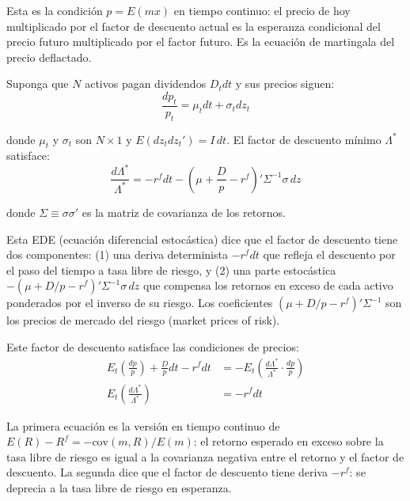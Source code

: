 \documentclass[12pt]{article}
\begin{document}
\begin{intuicionmat}
Esta es la condici\'on $p = E(mx)$ en tiempo continuo: el precio de hoy multiplicado por el factor de descuento actual es la esperanza condicional del precio futuro multiplicado por el factor futuro. Es la ecuaci\'on de martingala del precio deflactado.
\end{intuicionmat}

Suponga que $N$ activos pagan dividendos $D_t dt$ y sus precios siguen:
\begin{equation}
    \frac{dp_t}{p_t} = \mu_t dt + \sigma_t dz_t
\end{equation}

donde $\mu_t$ y $\sigma_t$ son $N \times 1$ y $E(dz_t dz_t') = I\, dt$. El factor de descuento m\'inimo $\Lambda^*$ satisface:
\begin{equation}
    \frac{d\Lambda^*}{\Lambda^*} = -r^f dt - \left(\mu + \frac{D}{p} - r^f\right)' \Sigma^{-1} \sigma\, dz
    \label{eq:lambda_ct}
\end{equation}

donde $\Sigma \equiv \sigma\sigma'$ es la matriz de covarianza de los retornos.

\begin{intuicionmat}
Esta EDE (ecuaci\'on diferencial estoc\'astica) dice que el factor de descuento tiene dos componentes: (1) una deriva determinista $-r^f dt$ que refleja el descuento por el paso del tiempo a tasa libre de riesgo, y (2) una parte estoc\'astica $-(\mu + D/p - r^f)' \Sigma^{-1} \sigma\, dz$ que compensa los retornos en exceso de cada activo ponderados por el inverso de su riesgo. Los coeficientes $(\mu + D/p - r^f)' \Sigma^{-1}$ son los precios de mercado del riesgo (market prices of risk).
\end{intuicionmat}

Este factor de descuento satisface las condiciones de precios:
\begin{align}
    E_t\left(\frac{dp}{p}\right) + \frac{D}{p}dt - r^f dt &= -E_t\left(\frac{d\Lambda^*}{\Lambda^*} \cdot \frac{dp}{p}\right) \\
    E_t\left(\frac{d\Lambda^*}{\Lambda^*}\right) &= -r^f dt
\end{align}

\begin{intuicionmat}
La primera ecuaci\'on es la versi\'on en tiempo continuo de $E(R) - R^f = -\text{cov}(m, R)/E(m)$: el retorno esperado en exceso sobre la tasa libre de riesgo es igual a la covarianza negativa entre el retorno y el factor de descuento. La segunda dice que el factor de descuento tiene deriva $-r^f$: se deprecia a la tasa libre de riesgo en esperanza.
\end{intuicionmat}
\end{document}
